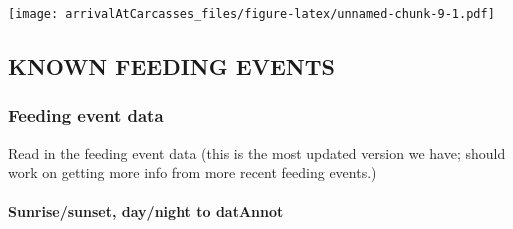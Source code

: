\documentclass[
]{article}
\begin{document}
\texttt{[image: arrivalAtCarcasses\_files/figure-latex/unnamed-chunk-9-1.pdf]}

\hypertarget{known-feeding-events}{%
\subsection{KNOWN FEEDING EVENTS}\label{known-feeding-events}}

\hypertarget{feeding-event-data}{%
\subsubsection{Feeding event data}\label{feeding-event-data}}

Read in the feeding event data (this is the most updated version we
have; should work on getting more info from more recent feeding events.)

\hypertarget{sunrisesunset-daynight-to-datannot}{%
\paragraph{Sunrise/sunset, day/night to
datAnnot}\label{sunrisesunset-daynight-to-datannot}}
\end{document}
